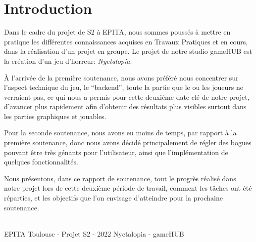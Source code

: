 \section{Introduction}
\setlength{\parindent}{5ex}
Dans le cadre du projet de S2 à EPITA, nous sommes poussés à mettre en pratique les différentes connaissances acquises en Travaux Pratiques et en cours, dans la réalisation d'un projet en groupe.
Le projet de notre studio gameHUB est la création d'un jeu d'horreur: \emph{Nyctalopia}.


À l'arrivée de la première soutenance, nous avons préféré nous concentrer sur l'aspect technique du jeu, le ``backend'', toute la partie que le ou les joueurs ne verraient pas, ce qui nous a permis pour cette deuxième date clé de notre projet, d'avancer plus rapidement afin d'obtenir des résultats plus visibles surtout dans les parties graphiques et jouables.

Pour la seconde soutenance, nous avons eu moins de temps, par rapport à la première soutenance, donc nous avons décidé principalement de régler des bogues pouvant être très génants pour l'utilisateur, ainsi que l'implémentation de quelques fonctionnalités. 

Nous présentons, dans ce rapport de soutenance, tout le progrès réalisé dans notre projet lors de cette deuxième période de travail, comment les tâches ont été réparties, et les objectifs que l'on envisage d'atteindre pour la prochaine soutenance.

\vfill
\noindent\makebox[\linewidth]{\rule{.8\paperwidth}{.6pt}}\\[0.2cm]
EPITA Toulouse - Projet S2 - 2022 \hfill Nyctalopia - gameHUB
\noindent\makebox[\linewidth]{\rule{.8\paperwidth}{.6pt}}

\newpage